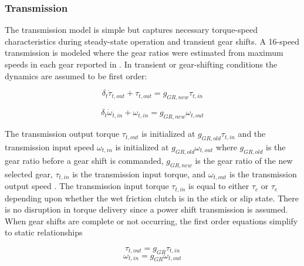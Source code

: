 \subsubsection{Transmission}
The transmission model is simple but captures necessary torque-speed characteristics during steady-state operation and transient gear shifts. A 16-speed transmission is modeled where the gear ratios were estimated from maximum
speeds in each gear reported in \cite{Caterpillar2002}. In transient or gear-shifting conditions the dynamics are assumed to be first order: 
\begin{linenomath*}
    \begin{equation}\label{eq:first_order_shift_torque}
        \delta_t\dot\tau_{t,out} + \tau_{t,out} = g_{GR,new}\tau_{t,in}
    \end{equation}
\end{linenomath*}
\begin{linenomath*}
    \begin{equation}\label{eq:first_order_shift_speed}
        \delta_t\dot\omega_{t,in} + \omega_{t,in} = g_{GR,new}\omega_{t,out}
    \end{equation}
\end{linenomath*}
The transmission output torque $\tau_{t,out}$ is initialized at $g_{GR,old}\tau_{t,in}$ and the transmission input speed $\omega_{t,in}$ is initialized at $g_{GR,old}\omega_{t,out}$ where $g_{GR,old}$ is the gear ratio before a gear shift is commanded, $g_{GR,new}$ is the gear ratio of the new selected gear, $\tau_{t,in}$ is the transmission input torque, and $\omega_{t,out}$ is the transmission output speed \cite{Rajamani2006}. The transmission input torque $\tau_{t,in}$ is equal to either $\tau_c$ or $\tau_e$ depending upon whether the wet friction clutch is in the stick or slip state. There is no disruption in torque delivery since a power shift transmission is assumed. When gear shifts are complete or not occurring, the first order equations simplify to static relationships
\begin{linenomath*}
    \begin{equation}\label{eq:static_shift_torque}
        \tau_{t,out} = g_{GR}\tau_{t,in}
    \end{equation}
    \begin{equation}\label{eq:static_shift_speed}
        \omega_{t,in} = g_{GR}\omega_{t,out}
    \end{equation}
\end{linenomath*}

